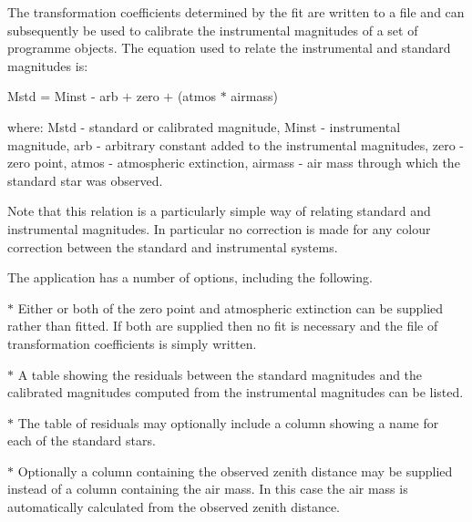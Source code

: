 \documentclass[twoside,11pt]{article}
\renewcommand{\_}{\texttt{\symbol{95}}}
\begin{document}
\begin{htmlonly}
{{      The transformation coefficients determined by the fit are
      written to a file and can subsequently be used to calibrate
      the instrumental magnitudes of a set of programme objects.
      The equation used to relate the instrumental and standard
      magnitudes is:

        Mstd = Minst - arb $+$ zero $+$ (atmos $*$ airmass)

      where:
        Mstd    - standard or calibrated magnitude,
        Minst   - instrumental magnitude,
        arb     - arbitrary constant added to the instrumental magnitudes,
        zero    - zero point,
        atmos   - atmospheric extinction,
        airmass - air mass through which the standard star was observed.

      Note that this relation is a particularly simple way of relating
      standard and instrumental magnitudes.  In particular no correction
      is made for any colour correction between the standard and
      instrumental systems.

      The application has a number of options, including the following.

      $*$ Either or both of the zero point and atmospheric extinction
        can be supplied rather than fitted.  If both are supplied then
        no fit is necessary and the file of transformation coefficients
        is simply written.

      $*$ A table showing the residuals between the standard magnitudes
        and the calibrated magnitudes computed from the instrumental
        magnitudes can be listed.

      $*$ The table of residuals may optionally include a column showing
        a name for each of the standard stars.

      $*$ Optionally a column containing the observed zenith distance
        may be supplied instead of a column containing the air mass.
        In this case the air mass is automatically calculated from the
        observed zenith distance.

}}
\end{htmlonly}
\end{document}

